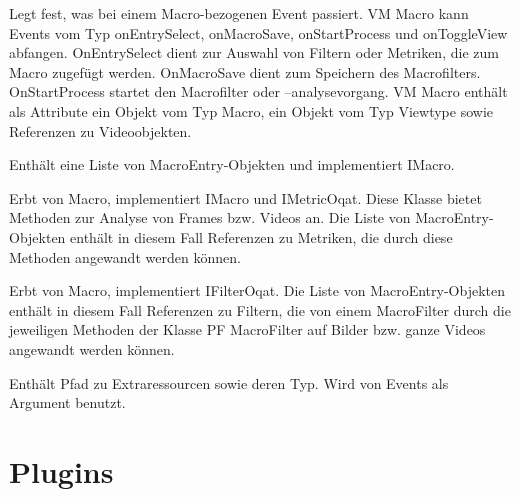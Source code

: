 Legt fest, was bei einem Macro-bezogenen Event passiert. VM Macro kann Events vom Typ onEntrySelect, onMacroSave, onStartProcess und onToggleView abfangen. OnEntrySelect dient zur Auswahl von Filtern oder Metriken, die zum Macro zugefügt werden. OnMacroSave dient zum Speichern des Macrofilters. OnStartProcess startet den Macrofilter oder –analysevorgang. VM Macro enthält als Attribute ein Objekt vom Typ Macro, ein Objekt vom Typ Viewtype sowie Referenzen zu Videoobjekten.


Enthält eine Liste von MacroEntry-Objekten und implementiert IMacro.


Erbt von Macro, implementiert IMacro und IMetricOqat. Diese Klasse bietet Methoden zur Analyse von Frames bzw. Videos an. Die Liste von MacroEntry-Objekten enthält in diesem Fall Referenzen zu Metriken, die durch diese Methoden angewandt werden können.


Erbt von Macro, implementiert IFilterOqat. Die Liste von MacroEntry-Objekten enthält in diesem Fall Referenzen zu Filtern, die von einem MacroFilter durch die jeweiligen Methoden der Klasse PF MacroFilter auf Bilder bzw. ganze Videos angewandt werden können.


Enthält Pfad zu Extraressourcen sowie deren Typ. Wird von Events als Argument benutzt.

\pagebreak
\section{Plugins}
